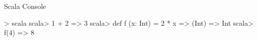 \documentclass[xcolor=pdflatex,dvipsnames,table]{beamer}
\begin{document}
\begin{frame}[fragile]{Scala Console}
\begin{scala}
> scala
scala> 1 + 2
=> 3
scala> def f (x: Int) = 2 * x
=> (Int) => Int
scala> f(4)
=> 8
\end{scala}
\end{frame}

% 
% 
% 
% 
% 
\end{document}
